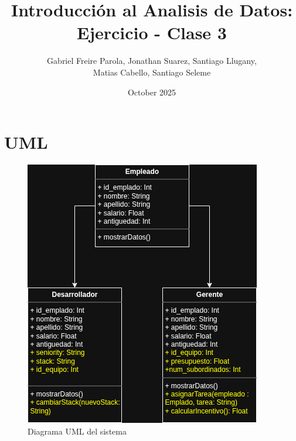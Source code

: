 \documentclass{article}
\title{Introducción al Analisis de Datos: Ejercicio - Clase 3}
\author{Gabriel Freire Parola, Jonathan Suarez, Santiago Llugany, \\ Matias Cabello, Santiago Seleme}
\date{October 2025}
\begin{document}
\maketitle
\section*{UML}
\begin{figure}[H]
    \centering
    \includegraphics[width=0.75\linewidth]{diagrama_uml.png}
    \caption{Diagrama UML del sistema}
    \label{fig:placeholder}
\end{figure}
\end{document}
